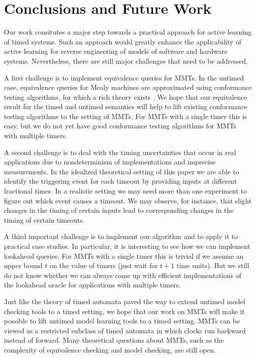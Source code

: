 \section{Conclusions and Future Work}
Our work consitutes a major step towards a practical approach for active learning of timed systems.
Such an approach would greatly enhance the applicability of active learning for reverse engineering of models of
software and hardware systems. Nevertheless, there are still major challenges that need to be addressed.

A first challenge is to implement equivalence queries for MMTs.
In the untimed case, equivalence queries for Mealy machines are approximated using conformance testing algorithms,
for which a rich theory exists \cite{LeeY96}.
We hope that our equivalence result for the timed and untimed semantics will help to lift existing conformance
testing algorithms to the setting of MMTs. For MMTs with a single timer this is easy, but we do not yet have good
conformance testing algorithms for MMTs with multiple timers.

A second challenge is to deal with the timing uncertainties that occur in real applications due to nondeterminism of
implementations and imprecise measurements. In the idealized theoretical setting of this paper we are able to
identify the triggering event for each timeout by providing inputs at different fractional times. In a realistic
setting we may need more than one experiment to figure out which event causes a timeout. We may observe, for instance,
that slight changes in the timing of certain inputs lead to corresponding changes in the timing of certain timeouts.

A third important challenge is to implement our algorithm and to apply it to practical case studies. In particular,
it is interesting to see how we can implement lookahead queries. For MMTs with a single timer this is trivial 
if we assume an upper bound $t$ on the value of timers (just  wait for $t+1$ time units).
But we still do not know whether we can always come up with efficient implementations of the lookahead oracle for applications with multiple timers.

Just like the theory of timed automata \cite{AD94} paved the way to extend untimed model checking tools to a timed
setting, we hope that our work on MMTs will make it possible to lift untimed model learning tools to a timed setting.
MMTs can be viewed as a restricted subclass of timed automata in which clocks run backward instead of forward.
Many theoretical questions about MMTs, such as the complexity of equivalence checking and model checking, are still open.
